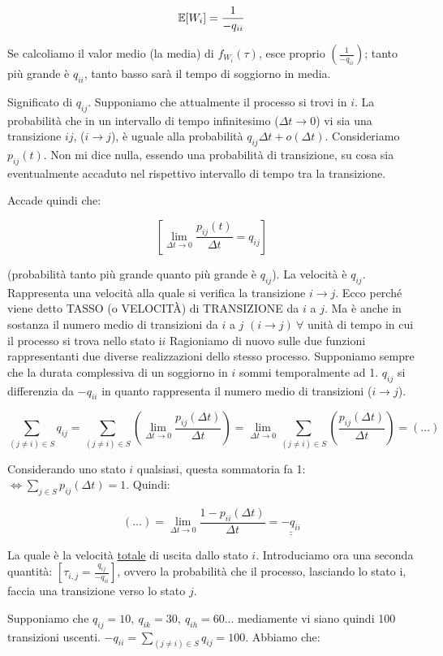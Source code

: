 \[
	\operatorname{\mathbb{E}}[W_i] = \frac{1}{-q_{ii}}
\]

Se calcoliamo il valor medio (la media) di $f_{W_i}(\tau)$, esce proprio $(\frac{1}{-q_{ii}})$; tanto più grande è $q_{ii}$, tanto basso sarà il tempo di soggiorno in media.

Significato di $q_{ij}$. Supponiamo che attualmente il processo si trovi in $i$. La probabilità che in un intervallo di tempo infinitesimo ($\Delta t \to 0$) vi sia una transizione $ij$, ($i \rightarrow j$), è uguale alla probabilità $q_{ij}\Delta t + o(\Delta t)$. Consideriamo $p_{ij}(t)$. Non mi dice nulla, essendo una probabilità di transizione, su cosa sia eventualmente accaduto nel rispettivo intervallo di tempo tra la transizione.

Accade quindi che:

\[
	[\lim_{\Delta t \to 0}{\frac{p_{ij}(t)}{\Delta t}} = q_{ij}]
\]

(probabilità tanto più grande quanto più grande è $q_{ij}$).
La velocità è $q_{ij}$. Rappresenta una velocità alla quale si verifica la transizione $i \rightarrow j$. Ecco perché viene detto TASSO (o VELOCIT\`A) di TRANSIZIONE da $i$ a $j$. Ma è anche in sostanza il numero medio di transizioni da $i$ a $j$ $(i \rightarrow j) \ \forall$ unità di tempo in cui il processo si trova nello stato i$i$ Ragioniamo di nuovo sulle due funzioni rappresentanti due diverse realizzazioni dello stesso processo. Supponiamo sempre che la durata complessiva di un soggiorno in $i$ sommi temporalmente ad 1. $q_{ij}$ si differenzia da $-q_{ii}$ in quanto rappresenta il numero medio di transizioni ($i \rightarrow j$).

\[
	\sum_{(j\neq i)\in S}{q_{ij}} = \sum_{(j\neq i)\in S}{(\lim_{\Delta t \to 0}{\frac{p_{ij}(\Delta t)}{\Delta t}})} = \lim_{\Delta t \to 0}{\sum_{(j\neq i)\in S}{(\frac{p_{ij}(\Delta t)}{\Delta t})}} = (\dots)
\]

Considerando uno stato $i$ qualsiasi, questa sommatoria fa 1: $\iff \sum_{j\in S}{p_{ij}(\Delta t)} = 1$. Quindi:

\[
	(\dots) = \lim_{\Delta t \to 0}{\frac{1-p_{ii}(\Delta t)}{\Delta t}} = \underline{\underline{-q_{ii}}}
\]

La quale è la velocità \underline{totale} di uscita dallo stato $i$. Introduciamo ora una seconda quantità: $[\tau_{i,j} = \frac{q_{ij}}{-q_{ii}}]$, ovvero la probabilità che il processo, lasciando lo stato i, faccia una transizione verso lo stato $j$. 

Supponiamo che $q_{ij}=10,\ q_{ik}=30,\ q_{ih}=60$... mediamente vi siano quindi 100 transizioni uscenti. $-q_{ii} = \sum_{(j\neq i)\in S}{q_{ij}} = 100$. Abbiamo che:

